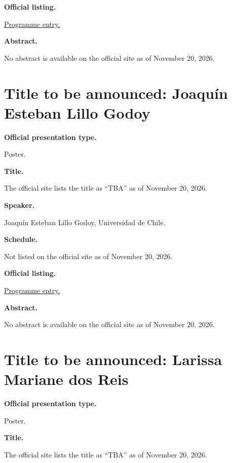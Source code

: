 \medskip\noindent
{\bf Official listing.}

\href{%
https://sites.google.com/view/%
geoalgcompluff/legal/%
legal-2027-resumos#h.f3btoqn8ykd7%
}{Programme entry.}

\medskip\noindent
{\bf Abstract.}

No abstract is available on the
official site as of November 20, 2026.

\section{Title to be announced: Joaquín
Esteban Lillo Godoy}
\label{section-tba-poster-godoy}

\medskip\noindent
{\bf Official presentation type.}

Poster.

\medskip\noindent
{\bf Title.}

The official site lists the title as
``TBA'' as of November 20, 2026.

\medskip\noindent
{\bf Speaker.}

Joaquín Esteban Lillo Godoy, Universidad de
Chile.

\medskip\noindent
{\bf Schedule.}

Not listed on the official site as of
November 20, 2026.

\medskip\noindent
{\bf Official listing.}

\href{%
https://sites.google.com/view/%
geoalgcompluff/legal/%
legal-2027-resumos#h.f3btoqn8ykd7%
}{Programme entry.}

\medskip\noindent
{\bf Abstract.}

No abstract is available on the
official site as of November 20, 2026.

\section{Title to be announced: Larissa
Mariane dos Reis}
\label{section-tba-poster-reis}

\medskip\noindent
{\bf Official presentation type.}

Poster.

\medskip\noindent
{\bf Title.}

The official site lists the title as
``TBA'' as of November 20, 2026.

